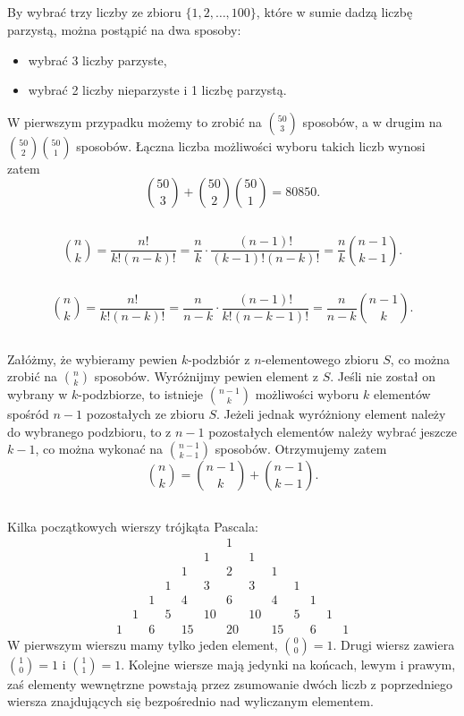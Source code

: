 \subsection{} %
By wybrać trzy liczby ze zbioru $\{1,2,\dots,100\}$, które w sumie dadzą liczbę parzystą, można postąpić na dwa sposoby:
\begin{itemize}
	\item wybrać 3 liczby parzyste,
	\item wybrać 2 liczby nieparzyste i 1 liczbę parzystą.
\end{itemize}
W pierwszym przypadku możemy to zrobić na $\binom{50}{3}$ sposobów, a w drugim na $\binom{50}{2}\binom{50}{1}$ sposobów. Łączna liczba możliwości wyboru takich liczb wynosi zatem
\[
	\binom{50}{3}+\binom{50}{2}\binom{50}{1} = 80850.
\]

\subsection{} %
\[
	\binom{n}{k} = \frac{n!}{k!(n-k)!} = \frac{n}{k}\cdot\frac{(n-1)!}{(k-1)!(n-k)!} = \frac{n}{k}\binom{n-1}{k-1}.
\]

\subsection{} %
\[
	\binom{n}{k} = \frac{n!}{k!(n-k)!} = \frac{n}{n-k}\cdot\frac{(n-1)!}{k!(n-k-1)!} = \frac{n}{n-k}\binom{n-1}{k}.
\]

\subsection{} %
Załóżmy, że wybieramy pewien $k$-podzbiór z $n$-elementowego zbioru $S$, co można zrobić na $\binom{n}{k}$ sposobów. Wyróżnijmy pewien element z $S$. Jeśli nie został on wybrany w $k$-podzbiorze, to istnieje $\binom{n-1}{k}$ możliwości wyboru $k$ elementów spośród $n-1$ pozostałych ze zbioru $S$. Jeżeli jednak wyróżniony element należy do wybranego podzbioru, to z $n-1$ pozostałych elementów należy wybrać jeszcze $k-1$, co można wykonać na $\binom{n-1}{k-1}$ sposobów. Otrzymujemy zatem
\[
	\binom{n}{k} = \binom{n-1}{k}+\binom{n-1}{k-1}.
\]

\subsection{} %
Kilka początkowych wierszy trójkąta Pascala:
\[
	\begin{array}{ccccccccccccc}
		&&&&&&1 \\
		&&&&&1&&1 \\
		&&&&1&&2&&1 \\
		&&&1&&3&&3&&1 \\
		&&1&&4&&6&&4&&1 \\
		&1&&5&&10&&10&&5&&1 \\
		1&&6&&15&&20&&15&&6&&1
	\end{array}
\]
W pierwszym wierszu mamy tylko jeden element, $\binom{0}{0}=1$. Drugi wiersz zawiera $\binom{1}{0}=1$ i $\binom{1}{1}=1$. Kolejne wiersze mają jedynki na końcach, lewym i prawym, zaś elementy wewnętrzne powstają przez zsumowanie dwóch liczb z poprzedniego wiersza znajdujących się bezpośrednio nad wyliczanym elementem.

